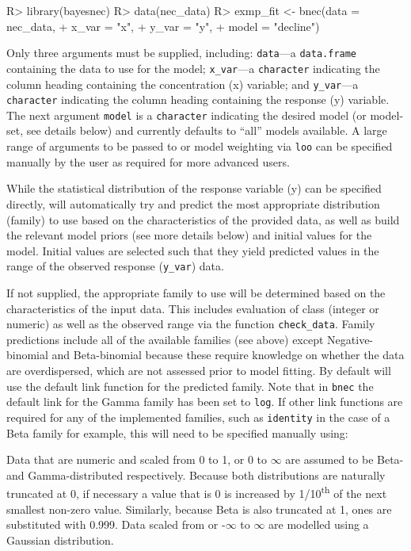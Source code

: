 \documentclass[
]{jss}
\begin{document}
\begin{CodeChunk}
\begin{CodeInput}
R> library(bayesnec)
R> data(nec_data)
R> exmp_fit <- bnec(data = nec_data, 
+                  x_var = "x", 
+                  y_var = "y", 
+                  model = "decline")
\end{CodeInput}
\end{CodeChunk}

Only three arguments must be supplied, including: \texttt{data}---a
\texttt{data.frame} containing the data to use for the model;
\texttt{x\_var}---a \texttt{character} indicating the column heading
containing the concentration (x) variable; and \texttt{y\_var}---a
\texttt{character} indicating the column heading containing the response
(y) variable. The next argument \texttt{model} is a \texttt{character}
indicating the desired model (or model-set, see details below) and
currently defaults to ``all'' models available. A large range of
arguments to be passed to  or model weighting via \texttt{loo}
can be specified manually by the user as required for more advanced
users.

While the statistical distribution of the response variable (y) can be
specified directly,  will automatically try and predict
the most appropriate distribution (family) to use based on the
characteristics of the provided data, as well as build the relevant
model priors (see more details below) and initial values for the
 model. Initial values are selected such that they yield
predicted values in the range of the observed response (\texttt{y\_var})
data.

If not supplied, the appropriate family to use will be determined based
on the characteristics of the input data. This includes evaluation of
class (integer or numeric) as well as the observed range via the
function \texttt{check\_data}. Family predictions include all of the
available families (see above) except Negative-binomial and
Beta-binomial because these require knowledge on whether the data are
overdispersed, which are not assessed prior to model fitting. By default
 will use the default link function for the predicted
family. Note that in \texttt{bnec} the default link for the Gamma family
has been set to \texttt{log}. If other link functions are required for
any of the implemented families, such as \texttt{identity} in the case
of a Beta family for example, this will need to be specified manually
using:

Data that are numeric and scaled from 0 to 1, or 0 to \(\infty\) are
assumed to be Beta- and Gamma-distributed respectively. Because both
distributions are naturally truncated at 0, if necessary a value that is
0 is increased by 1/10\textsuperscript{th} of the next smallest non-zero
value. Similarly, because Beta is also truncated at 1, ones are
substituted with 0.999. Data scaled from or -\(\infty\) to \(\infty\)
are modelled using a Gaussian distribution.
\end{document}
